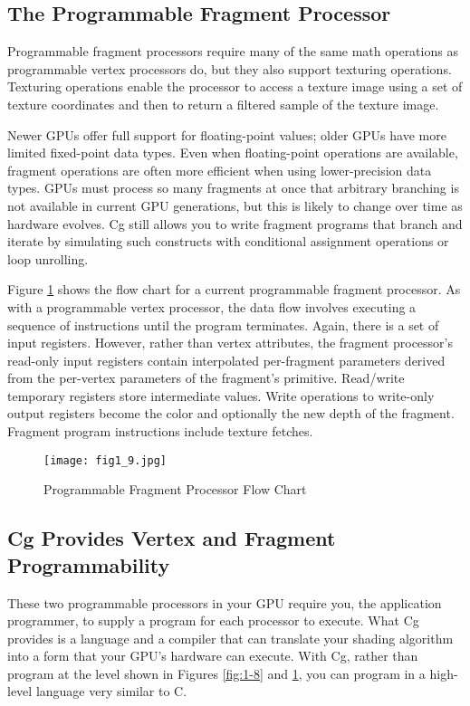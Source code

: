 \documentclass[../main.tex]{subfiles}
\begin{document}
\subsection*{The Programmable Fragment Processor}

Programmable fragment processors require many of the same math operations as programmable vertex processors do, but they also support texturing operations. Texturing operations enable the processor to access a texture image using a set of texture coordinates and then to return a filtered sample of the texture image.

Newer GPUs offer full support for floating-point values; older GPUs have more limited fixed-point data types. Even when floating-point operations are available, fragment operations are often more efficient when using lower-precision data types. GPUs must process so many fragments at once that arbitrary branching is not available in current GPU generations, but this is likely to change over time as hardware evolves. Cg still allows you to write fragment programs that branch and iterate by simulating such constructs with conditional assignment operations or loop unrolling.

Figure \ref{fig:1-9} shows the flow chart for a current programmable fragment processor. As with a programmable vertex processor, the data flow involves executing a sequence of instructions until the program terminates. Again, there is a set of input registers. However, rather than vertex attributes, the fragment processor's read-only input registers contain interpolated per-fragment parameters derived from the per-vertex parameters of the fragment's primitive. Read/write temporary registers store intermediate values. Write operations to write-only output registers become the color and optionally the new depth of the fragment. Fragment program instructions include texture fetches.

\begin{figure}
    \centering
    \texttt{[image: fig1\_9.jpg]}
    \caption{Programmable Fragment Processor Flow Chart}
    \label{fig:1-9}
\end{figure}

\subsection{Cg Provides Vertex and Fragment Programmability}

These two programmable processors in your GPU require you, the application programmer, to supply a program for each processor to execute. What Cg provides is a language and a compiler that can translate your shading algorithm into a form that your GPU's hardware can execute. With Cg, rather than program at the level shown in Figures \ref{fig:1-8} and \ref{fig:1-9}, you can program in a high-level language very similar to C.
\end{document}
